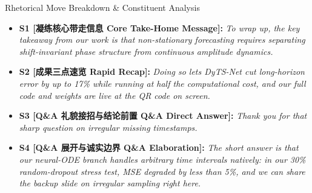 \begin{TipBox}{Rhetorical Move Breakdown \& Constituent Analysis}
\begin{itemize}[leftmargin=1.5em]
  \item \textbf{S1 [凝练核心带走信息 Core Take-Home Message]:} \textit{To wrap up, the key takeaway from our work is that non-stationary forecasting requires separating shift-invariant phase structure from continuous amplitude dynamics.}\par{}
  \item \textbf{S2 [成果三点速览 Rapid Recap]:} \textit{Doing so lets DyTS-Net cut long-horizon error by up to 17\% while running at half the computational cost, and our full code and weights are live at the QR code on screen.}\par{}
  \item \textbf{S3 [Q\&A 礼貌接招与结论前置 Q\&A Direct Answer]:} \textit{Thank you for that sharp question on irregular missing timestamps.}\par{}
  \item \textbf{S4 [Q\&A 展开与诚实边界 Q\&A Elaboration]:} \textit{The short answer is that our neural-ODE branch handles arbitrary time intervals natively: in our 30\% random-dropout stress test, MSE degraded by less than 5\%, and we can share the backup slide on irregular sampling right here.}\par{}
\end{itemize}
\end{TipBox}
\medskip
\clearpage
